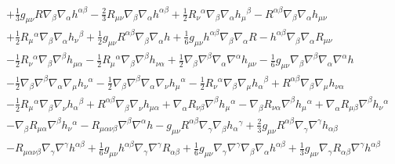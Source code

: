 \documentclass[10pt,letterpaper]{article}
\numberwithin{equation}{section}
\begin{document}
\begin{eqnarray}
&& + \tfrac{1}{3} g_{\mu \nu } R \nabla_{\beta }\nabla_{\alpha }h^{\alpha \beta } -  \tfrac{2}{3} R_{\mu \nu } \nabla_{\beta }\nabla_{\alpha }h^{\alpha \beta } + \tfrac{1}{2} R_{\nu }{}^{\alpha } \nabla_{\beta }\nabla_{\alpha }h_{\mu }{}^{\beta } -  R^{\alpha \beta } \nabla_{\beta }\nabla_{\alpha }h_{\mu \nu } \nonumber \\ 
&& + \tfrac{1}{2} R_{\mu }{}^{\alpha } \nabla_{\beta }\nabla_{\alpha }h_{\nu }{}^{\beta } + \tfrac{1}{2} g_{\mu \nu } R^{\alpha \beta } \nabla_{\beta }\nabla_{\alpha }h + \tfrac{1}{6} g_{\mu \nu } h^{\alpha \beta } \nabla_{\beta }\nabla_{\alpha }R -  h^{\alpha \beta } \nabla_{\beta }\nabla_{\alpha }R_{\mu \nu } \nonumber \\ 
&& -  \tfrac{1}{2} R_{\nu }{}^{\alpha } \nabla_{\beta }\nabla^{\beta }h_{\mu \alpha } -  \tfrac{1}{2} R_{\mu }{}^{\alpha } \nabla_{\beta }\nabla^{\beta }h_{\nu \alpha } + \tfrac{1}{2} \nabla_{\beta }\nabla^{\beta }\nabla_{\alpha }\nabla^{\alpha }h_{\mu \nu } -  \tfrac{1}{6} g_{\mu \nu } \nabla_{\beta }\nabla^{\beta }\nabla_{\alpha }\nabla^{\alpha }h \nonumber \\ 
&& -  \tfrac{1}{2} \nabla_{\beta }\nabla^{\beta }\nabla_{\alpha }\nabla_{\mu }h_{\nu }{}^{\alpha } -  \tfrac{1}{2} \nabla_{\beta }\nabla^{\beta }\nabla_{\alpha }\nabla_{\nu }h_{\mu }{}^{\alpha } -  \tfrac{1}{2} R_{\nu }{}^{\alpha } \nabla_{\beta }\nabla_{\mu }h_{\alpha }{}^{\beta } + R^{\alpha \beta } \nabla_{\beta }\nabla_{\mu }h_{\nu \alpha } \nonumber \\ 
&& -  \tfrac{1}{2} R_{\mu }{}^{\alpha } \nabla_{\beta }\nabla_{\nu }h_{\alpha }{}^{\beta } + R^{\alpha \beta } \nabla_{\beta }\nabla_{\nu }h_{\mu \alpha } + \nabla_{\alpha }R_{\nu \beta } \nabla^{\beta }h_{\mu }{}^{\alpha } -  \nabla_{\beta }R_{\nu \alpha } \nabla^{\beta }h_{\mu }{}^{\alpha } + \nabla_{\alpha }R_{\mu \beta } \nabla^{\beta }h_{\nu }{}^{\alpha } \nonumber \\ 
&& -  \nabla_{\beta }R_{\mu \alpha } \nabla^{\beta }h_{\nu }{}^{\alpha } -  R_{\mu \alpha \nu \beta } \nabla^{\beta }\nabla^{\alpha }h -  g_{\mu \nu } R^{\alpha \beta } \nabla_{\gamma }\nabla_{\beta }h_{\alpha }{}^{\gamma } + \tfrac{2}{3} g_{\mu \nu } R^{\alpha \beta } \nabla_{\gamma }\nabla^{\gamma }h_{\alpha \beta } \nonumber \\ 
&& -  R_{\mu \alpha \nu \beta } \nabla_{\gamma }\nabla^{\gamma }h^{\alpha \beta } + \tfrac{1}{6} g_{\mu \nu } h^{\alpha \beta } \nabla_{\gamma }\nabla^{\gamma }R_{\alpha \beta } + \tfrac{1}{6} g_{\mu \nu } \nabla_{\gamma }\nabla^{\gamma }\nabla_{\beta }\nabla_{\alpha }h^{\alpha \beta } + \tfrac{1}{3} g_{\mu \nu } \nabla_{\gamma }R_{\alpha \beta } \nabla^{\gamma }h^{\alpha \beta } \nonumber \\ 

\end{eqnarray}
\end{document}
